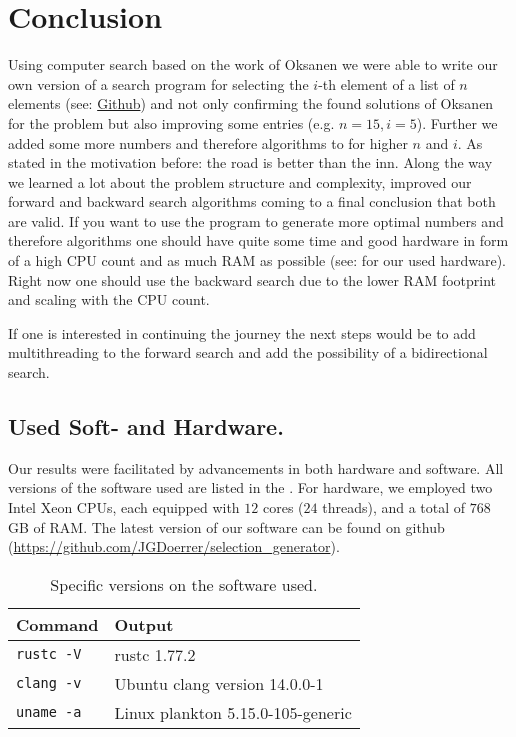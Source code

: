 \documentclass[twoside,leqno,twocolumn]{article}
\begin{document}
\section{Conclusion}

Using computer search based on the work of Oksanen we were able to write our own version of a search program for selecting the $i$-th element of a list of $n$ elements (see: \href{https://github.com/JGDoerrer/selection_generator}{Github}) and not only confirming the found solutions of Oksanen for the problem but also improving some entries (e.g. $n = 15, i = 5$).
Further we added some more numbers and therefore algorithms to  for higher $n$ and $i$.
As stated in the motivation before: the road is better than the inn.
Along the way we learned a lot about the problem structure and complexity, improved our forward and backward search algorithms coming to a final conclusion that both are valid.
If you want to use the program to generate more optimal numbers and therefore algorithms one should have quite some time and good hardware in form of a high CPU count and as much RAM as possible (see:  for our used hardware).
Right now one should use the backward search due to the lower RAM footprint and scaling with the CPU count.

If one is interested in continuing the journey the next steps would be to add multithreading to the forward search and add the possibility of a bidirectional search.


\subsection{Used Soft- and Hardware.} \label{sec:hardware}

Our results were facilitated by advancements in both hardware and software.
All versions of the software used are listed in the .
For hardware, we employed two Intel Xeon CPUs, each equipped with $12$ cores ($24$ threads), and a total of $768$ GB of RAM.
The latest version of our software can be found on github (\url{https://github.com/JGDoerrer/selection_generator}).

\begin{table}[!t]
  \renewcommand{\arraystretch}{1.2}
  \caption{Specific versions on the software used.}
  \label{table:command_outputs}
  \centering
  \begin{tabular}{l|l}
    \textbf{Command}  & \textbf{Output}                   \\ \hline
    \texttt{rustc -V} & rustc 1.77.2                      \\ \hline
    \texttt{clang -v} & Ubuntu clang version 14.0.0-1     \\ \hline
    \texttt{uname -a} & Linux plankton 5.15.0-105-generic \\
  \end{tabular}
\end{table}
\end{document}
